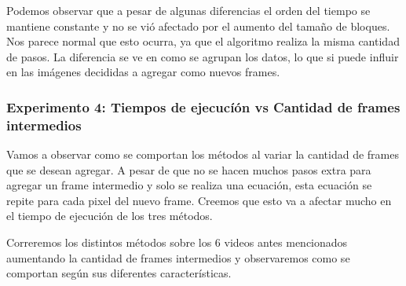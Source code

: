 \begin{figure}[ht]
	\begin{center}
	\end{center}
\end{figure}
\par Podemos observar que a pesar de algunas diferencias el orden del tiempo se mantiene constante y no se vi\'o afectado por el aumento del tama\~no de bloques. Nos parece normal que esto ocurra, ya que el algoritmo realiza la misma cantidad de pasos. La diferencia se ve en como se agrupan los datos, lo que si puede influir en las im\'agenes decididas a agregar como nuevos frames.



\subsubsection{Experimento 4: Tiempos de ejecucí\'on vs Cantidad de frames intermedios}
\par Vamos a observar como se comportan los m\'etodos al variar la cantidad de frames que se desean agregar. A pesar de que no se hacen muchos pasos extra para agregar un frame intermedio y solo se realiza una ecuaci\'on, esta ecuaci\'on se repite para cada pixel del nuevo frame. Creemos que esto va a afectar mucho en el tiempo de ejecuci\'on de los tres m\'etodos.
\par Correremos los distintos m\'etodos sobre los 6 videos antes mencionados aumentando la cantidad de frames intermedios y observaremos como se comportan seg\'un sus diferentes caracter\'isticas.

